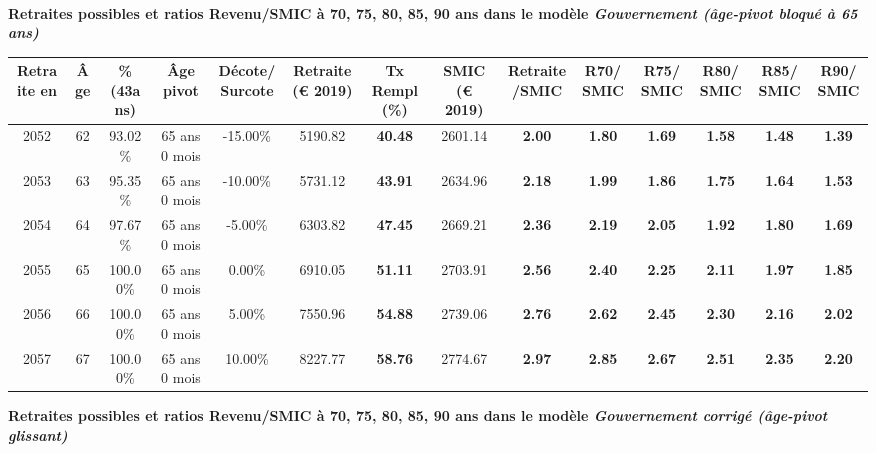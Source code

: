  ~\\{\bf \noindent Retraites possibles et ratios Revenu/SMIC à 70, 75, 80, 85, 90 ans dans le modèle \emph{Gouvernement (âge-pivot bloqué à 65 ans)}}  
 
\begin{adjustbox}{max width=\textwidth} 
\begin{tabular}[htb]{|c|c||c|c|c||c|c||c|c||c|c|c|c|c|} 
\hline 
 Retraite en &  Âge &  \%(43ans) &  Âge pivot &  Décote/Surcote &  Retraite (\euro{} 2019) &  Tx Rempl(\%) &  SMIC (\euro{} 2019) &  Retraite/SMIC &  R70/SMIC &  R75/SMIC &  R80/SMIC &  R85/SMIC &  R90/SMIC \\ 
\hline \hline 
 2052 &  62 &  93.02\% &  65 ans 0 mois &  -15.00\% &  5190.82 &  {\bf 40.48} &  2601.14 &  {\bf 2.00} &  {\bf 1.80} &  {\bf 1.69} &  {\bf 1.58} &  {\bf 1.48} &  {\bf 1.39} \\ 
\hline 
 2053 &  63 &  95.35\% &  65 ans 0 mois &  -10.00\% &  5731.12 &  {\bf 43.91} &  2634.96 &  {\bf 2.18} &  {\bf 1.99} &  {\bf 1.86} &  {\bf 1.75} &  {\bf 1.64} &  {\bf 1.53} \\ 
\hline 
 2054 &  64 &  97.67\% &  65 ans 0 mois &  -5.00\% &  6303.82 &  {\bf 47.45} &  2669.21 &  {\bf 2.36} &  {\bf 2.19} &  {\bf 2.05} &  {\bf 1.92} &  {\bf 1.80} &  {\bf 1.69} \\ 
\hline 
 2055 &  65 &  100.00\% &  65 ans 0 mois &  0.00\% &  6910.05 &  {\bf 51.11} &  2703.91 &  {\bf 2.56} &  {\bf 2.40} &  {\bf 2.25} &  {\bf 2.11} &  {\bf 1.97} &  {\bf 1.85} \\ 
\hline 
 2056 &  66 &  100.00\% &  65 ans 0 mois &  5.00\% &  7550.96 &  {\bf 54.88} &  2739.06 &  {\bf 2.76} &  {\bf 2.62} &  {\bf 2.45} &  {\bf 2.30} &  {\bf 2.16} &  {\bf 2.02} \\ 
\hline 
 2057 &  67 &  100.00\% &  65 ans 0 mois &  10.00\% &  8227.77 &  {\bf 58.76} &  2774.67 &  {\bf 2.97} &  {\bf 2.85} &  {\bf 2.67} &  {\bf 2.51} &  {\bf 2.35} &  {\bf 2.20} \\ 
\hline 
\hline 
\end{tabular} 
\end{adjustbox} 
 
 \vspace{0.1cm} 
{\bf \noindent Retraites possibles et ratios Revenu/SMIC à 70, 75, 80, 85, 90 ans dans le modèle \emph{Gouvernement corrigé (âge-pivot glissant)}}  
 
